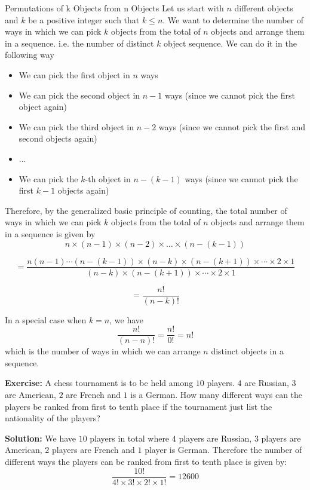 \begin{keyconceptbox}{Permutations of k Objects from n Objects}
Let us start with \(n\) different objects and \(k\) be a positive integer such that \(k \leq n\). We want to determine the number of ways in which we can pick \(k\) objects from the total of \(n\) objects and arrange them in a sequence. i.e. the number of distinct \(k\) object sequence. We can do it in the following way 

\begin{itemize}
    \item We can pick the first object in \(n\) ways
    \item We can pick the second object in \(n-1\) ways (since we cannot pick the first object again)
    \item We can pick the third object in \(n-2\) ways (since we cannot pick the first and second objects again)
    \item ...
    \item We can pick the \(k\)-th object in \(n-(k-1)\) ways (since we cannot pick the first \(k-1\) objects again)
\end{itemize}

Therefore, by the generalized basic principle of counting, the total number of ways in which we can pick \(k\) objects from the total of \(n\) objects and arrange them in a sequence is given by
\[ 
    n \times (n-1) \times (n-2) \times \ldots \times (n-(k-1)) 
\]

\[
    = \frac{n(n-1)\cdots(n-(k-1))\times (n-k) \times (n-(k+1)) \times \cdots \times 2 \times 1}{(n-k) \times (n-(k+1)) \times \cdots \times 2 \times 1} 
\]

\[
= \frac{n!}{(n-k)!}
\]

In a special case when \(k=n\), we have
\[ \frac{n!}{(n-n)!} = \frac{n!}{0!} = n! \]
which is the number of ways in which we can arrange \(n\) distinct objects in a sequence.
\end{keyconceptbox}
\begin{exercisebox}
    \textbf{Exercise:} A chess tournament is to be held among \(10\) players. \(4\) are Russian, \(3\) are American, \(2\) are French and \(1\) is a German. How many different ways can the players be ranked from first to tenth place if the tournament just list the nationality of the players?
\end{exercisebox}


\begin{solutionbox}
    \textbf{Solution:} We have \(10\) players in total where \(4\) players are Russian, \(3\) players are American, \(2\) players are French and \(1\) player is German. Therefore the number of different ways the players can be ranked from first to tenth place is given by:
    \[ \frac{10!}{4! \times 3! \times 2! \times 1!} = 12600 \]
\end{solutionbox}

